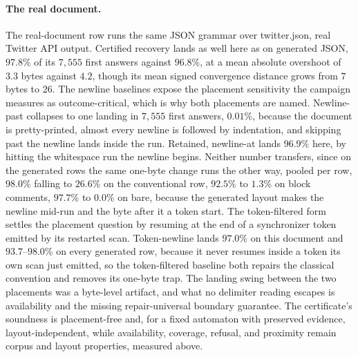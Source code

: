 \documentclass[11pt,a4paper]{article}
\theoremstyle{definition}
\theoremstyle{plain}
\theoremstyle{remark}
\begin{document}
\paragraph{The real document.} The real-document row runs the same JSON grammar over twitter.json, real Twitter API
output. Certified recovery lands as well here as on generated JSON, $97.8$\% of its $7{,}555$ first answers against
$96.8$\%, at a mean absolute overshoot of $3.3$ bytes against $4.2$, though its mean signed convergence distance grows
from $7$ bytes to $26$. The newline baselines expose the placement sensitivity the campaign measures as
outcome-critical, which is why both placements are named. Newline-past collapses to one landing in $7{,}555$ first
answers, $0.01$\%, because the document is pretty-printed, almost every newline is followed by indentation, and skipping
past the newline lands inside the run. Retained, newline-at lands $96.9$\% here, by hitting the whitespace run the
newline begins. Neither number transfers, since on the generated rows the same one-byte change runs the other way,
pooled per row, $98.0$\%
falling to $26.6$\% on the conventional row, $92.5$\% to $1.3$\% on block comments, $97.7$\% to $0.0$\% on bare, because
the generated layout makes the newline mid-run and the byte after it a token start. The token-filtered form settles the
placement question by resuming at the end of a synchronizer token emitted by its restarted scan. Token-newline lands
$97.0$\% on this document and $93.7$--$98.0$\% on every generated row, because it never resumes inside a token its own
scan just emitted, so the token-filtered baseline both repairs the classical convention and removes its one-byte trap.
The landing swing between the two placements was a byte-level artifact, and what no delimiter reading escapes is
availability and the missing repair-universal boundary guarantee. The certificate's soundness is placement-free and, for
a fixed automaton with preserved evidence, layout-independent, while availability, coverage, refusal, and proximity
remain corpus and layout properties, measured above.
\end{document}
